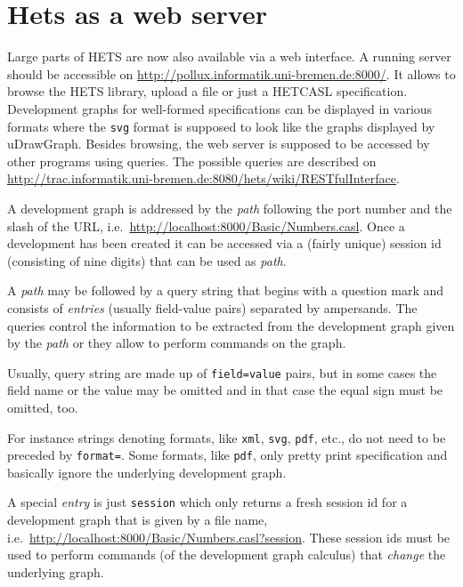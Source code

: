 \documentclass{article}
\newcommand{\normalTEXTSC}[2]{{#1\scriptsize#2}}
\newcommand     {\Hets}{\normalTEXTSC{H}{ETS}\xspace}
\newcommand{\HetCASL}{\normalTEXTSC{H}{ET}\normalTEXTSC{C}{ASL}\xspace}
\begin{document}
\section{Hets as a web server}\label{sec:Server}

Large parts of \Hets are now also available via a web interface. A running
server should be accessible on
\url{http://pollux.informatik.uni-bremen.de:8000/}. It allows to browse the
\Hets library, upload a file or just a \HetCASL specification. Development
graphs for well-formed specifications can be displayed in various formats
where the \texttt{svg} format is supposed to look like the graphs displayed by
uDrawGraph. Besides browsing, the web server is supposed to be accessed by
other programs using queries. The possible queries are described on
\url{http://trac.informatik.uni-bremen.de:8080/hets/wiki/RESTfulInterface}.

A development graph is addressed by the \emph{path} following the port number
and the slash of the URL, i.e.\
\url{http://localhost:8000/Basic/Numbers.casl}. Once a development has been
created it can be accessed via a (fairly unique) session id (consisting of
nine digits) that can be used as \emph{path}.

A \emph{path} may be followed by a query string that begins with a question
mark and consists of \emph{entries} (usually field-value pairs) separated by
ampersands. The queries control the information to be extracted from the
development graph given by the \emph{path} or they allow to perform commands
on the graph.

Usually, query string are made up of \texttt{field=value} pairs, but in some
cases the field name or the value may be omitted and in that case the equal
sign must be omitted, too.

For instance strings denoting formats, like \texttt{xml}, \texttt{svg},
\texttt{pdf}, etc., do not need to be preceded by \texttt{format=}.  Some
formats, like \texttt{pdf}, only pretty print specification and
basically ignore the underlying development graph.

A special \emph{entry} is just \texttt{session} which only returns a fresh
session id for a development graph that is given by a file name, i.e.\
\url{http://localhost:8000/Basic/Numbers.casl?session}. These session ids must
be used to perform commands (of the development graph calculus) that
\emph{change} the underlying graph.
\end{document}
